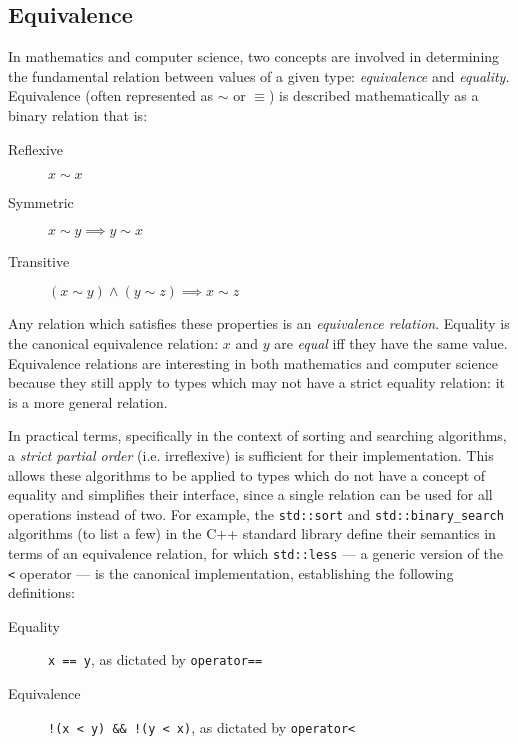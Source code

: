 \subsection{Equivalence}

In mathematics and computer science, two concepts are involved in determining
the fundamental relation between values of a given type: \textit{equivalence}
and \textit{equality}.  Equivalence (often represented as $\sim$ or $\equiv$) is
described mathematically as a binary relation that is:

\begin{description}
    \item[Reflexive] $x \sim x$
    \item[Symmetric] $x \sim y \implies y \sim x$
    \item[Transitive] $(x \sim y) \land (y \sim z) \implies x \sim z$
\end{description}

Any relation which satisfies these properties is an \textit{equivalence
relation}.  Equality is the canonical equivalence relation: $x$ and $y$ are
\textit{equal} iff they have the same value.  Equivalence relations are
interesting in both mathematics and computer science because they still apply to
types which may not have a strict equality relation: it is a more general
relation.

In practical terms, specifically in the context of sorting and searching
algorithms, a \textit{strict partial order} (i.e. irreflexive) is sufficient for
their implementation.  This allows these algorithms to be applied to types which
do not have a concept of equality and simplifies their interface, since a single
relation can be used for all operations instead of two.  For example, the
\texttt{std::sort} and \texttt{std::binary\_search} algorithms (to list a few)
in the C++ standard library define their semantics in terms of an equivalence
relation, for which \texttt{std::less} --- a generic version of the \texttt{<}
operator --- is the canonical implementation, establishing the following
definitions:

\begin{description}
    \item[Equality]
        \texttt{x == y}, as dictated by \texttt{operator==}
    \item[Equivalence]
        \texttt{!(x < y) \&\& !(y < x)}, as dictated by \texttt{operator<}
\end{description}



